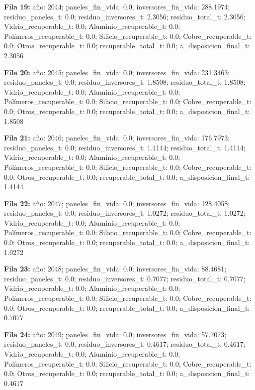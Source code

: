 {\footnotesize\textbf{Fila 19:} año: 2044; paneles\_fin\_vida: 0.0; inversores\_fin\_vida: 288.1974; residuo\_paneles\_t: 0.0; residuo\_inversores\_t: 2.3056; residuo\_total\_t: 2.3056; Vidrio\_recuperable\_t: 0.0; Aluminio\_recuperable\_t: 0.0; Polímeros\_recuperable\_t: 0.0; Silicio\_recuperable\_t: 0.0; Cobre\_recuperable\_t: 0.0; Otros\_recuperable\_t: 0.0; recuperable\_total\_t: 0.0; a\_disposicion\_final\_t: 2.3056\par}
{\footnotesize\textbf{Fila 20:} año: 2045; paneles\_fin\_vida: 0.0; inversores\_fin\_vida: 231.3463; residuo\_paneles\_t: 0.0; residuo\_inversores\_t: 1.8508; residuo\_total\_t: 1.8508; Vidrio\_recuperable\_t: 0.0; Aluminio\_recuperable\_t: 0.0; Polímeros\_recuperable\_t: 0.0; Silicio\_recuperable\_t: 0.0; Cobre\_recuperable\_t: 0.0; Otros\_recuperable\_t: 0.0; recuperable\_total\_t: 0.0; a\_disposicion\_final\_t: 1.8508\par}
{\footnotesize\textbf{Fila 21:} año: 2046; paneles\_fin\_vida: 0.0; inversores\_fin\_vida: 176.7973; residuo\_paneles\_t: 0.0; residuo\_inversores\_t: 1.4144; residuo\_total\_t: 1.4144; Vidrio\_recuperable\_t: 0.0; Aluminio\_recuperable\_t: 0.0; Polímeros\_recuperable\_t: 0.0; Silicio\_recuperable\_t: 0.0; Cobre\_recuperable\_t: 0.0; Otros\_recuperable\_t: 0.0; recuperable\_total\_t: 0.0; a\_disposicion\_final\_t: 1.4144\par}
{\footnotesize\textbf{Fila 22:} año: 2047; paneles\_fin\_vida: 0.0; inversores\_fin\_vida: 128.4058; residuo\_paneles\_t: 0.0; residuo\_inversores\_t: 1.0272; residuo\_total\_t: 1.0272; Vidrio\_recuperable\_t: 0.0; Aluminio\_recuperable\_t: 0.0; Polímeros\_recuperable\_t: 0.0; Silicio\_recuperable\_t: 0.0; Cobre\_recuperable\_t: 0.0; Otros\_recuperable\_t: 0.0; recuperable\_total\_t: 0.0; a\_disposicion\_final\_t: 1.0272\par}
{\footnotesize\textbf{Fila 23:} año: 2048; paneles\_fin\_vida: 0.0; inversores\_fin\_vida: 88.4681; residuo\_paneles\_t: 0.0; residuo\_inversores\_t: 0.7077; residuo\_total\_t: 0.7077; Vidrio\_recuperable\_t: 0.0; Aluminio\_recuperable\_t: 0.0; Polímeros\_recuperable\_t: 0.0; Silicio\_recuperable\_t: 0.0; Cobre\_recuperable\_t: 0.0; Otros\_recuperable\_t: 0.0; recuperable\_total\_t: 0.0; a\_disposicion\_final\_t: 0.7077\par}
{\footnotesize\textbf{Fila 24:} año: 2049; paneles\_fin\_vida: 0.0; inversores\_fin\_vida: 57.7073; residuo\_paneles\_t: 0.0; residuo\_inversores\_t: 0.4617; residuo\_total\_t: 0.4617; Vidrio\_recuperable\_t: 0.0; Aluminio\_recuperable\_t: 0.0; Polímeros\_recuperable\_t: 0.0; Silicio\_recuperable\_t: 0.0; Cobre\_recuperable\_t: 0.0; Otros\_recuperable\_t: 0.0; recuperable\_total\_t: 0.0; a\_disposicion\_final\_t: 0.4617\par}
